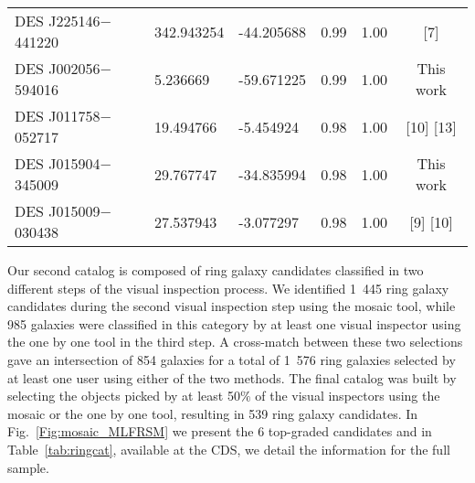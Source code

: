 \documentclass[tradiabstract,twocolumn]{aa}
\begin{document}
\begin{table*}
\begin{tabular}{l l l l c c }
DES J225146$-$441220 &  342.943254 & -44.205688 &      0.99 &                    1.00 &                       [7] \\
DES J002056$-$594016 &    5.236669 & -59.671225 &      0.99 &                    1.00 &                 This work \\
DES J011758$-$052717 &   19.494766 &  -5.454924 &      0.98 &                    1.00 &                [10]  [13] \\
DES J015904$-$345009 &   29.767747 & -34.835994 &      0.98 &                    1.00 &                 This work \\
DES J015009$-$030438 &   27.537943 &  -3.077297 &      0.98 &                    1.00 &                 [9]  [10] \\
\hline                  
\end{tabular}
\end{table*}

Our second catalog is composed of ring galaxy candidates classified in two different steps of the visual inspection process. We identified 1~445 ring galaxy candidates during the second visual inspection step using the mosaic tool, while 985 galaxies were classified in this category by at least one visual inspector using the one by one tool in the third step. A cross-match between these two selections gave an intersection of 854 galaxies for a total of 1~576 ring galaxies selected by at least one user using either of the two methods. The final catalog was built by selecting the objects picked by at least 50$\%$ of the visual inspectors using the mosaic or the one by one tool, resulting in 539 ring galaxy candidates. In Fig.~\ref{Fig:mosaic_MLFRSM} we present the 6 top-graded candidates and in Table~\ref{tab:ringcat}, available at the CDS, we detail the information for the full sample.
\end{document}
